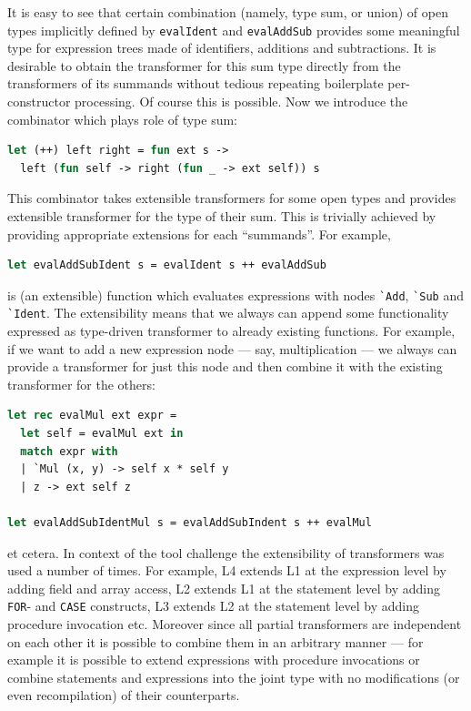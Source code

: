 It is easy to see that certain combination (namely, type sum, or union) of open types 
implicitly defined by \lstinline{evalIdent} and \lstinline{evalAddSub} provides some meaningful
type for expression trees made of identifiers, additions and subtractions. It is desirable to
obtain the transformer for this sum type directly from the transformers of its summands without
tedious repeating boilerplate per-constructor processing. Of course this is possible.
Now we introduce the combinator which plays role of type sum:

\begin{lstlisting}[language=ocaml]
let (++) left right = fun ext s -> 
  left (fun self -> right (fun _ -> ext self)) s
\end{lstlisting}

This combinator takes extensible transformers for some open types and provides extensible transformer 
for the type of their sum. This is trivially achieved by providing appropriate extensions for each ``summands''.
For example,

\begin{lstlisting}[language=ocaml]
let evalAddSubIdent s = evalIdent s ++ evalAddSub
\end{lstlisting}

is (an extensible) function which evaluates expressions with nodes \lstinline{`Add}, \lstinline{`Sub} and
\lstinline{`Ident}. The extensibility means that we always can append some functionality expressed as
type-driven transformer to already existing functions. For example, if we want to add a new expression
node --- say, multiplication --- we always can provide a transformer for just this node and then combine 
it with the existing transformer for the others:

\begin{lstlisting}[language=ocaml]
let rec evalMul ext expr =
  let self = evalMul ext in
  match expr with
  | `Mul (x, y) -> self x * self y
  | z -> ext self z

let evalAddSubIdentMul s = evalAddSubIndent s ++ evalMul
\end{lstlisting}

et cetera. In context of the tool challenge the extensibility of transformers was used a number of times.
For example, L4 extends L1 at the expression level by adding field and array access, L2 extends L1 at the 
statement level by adding \lstinline{FOR}- and \lstinline{CASE} constructs, L3 extends L2 at the statement 
level by adding procedure invocation etc. Moreover since all partial transformers are independent on
each other it is possible to combine them in an arbitrary manner --- for example it is possible to
extend expressions with procedure invocations or combine statements and expressions into the joint type with
no modifications (or even recompilation) of their counterparts.

